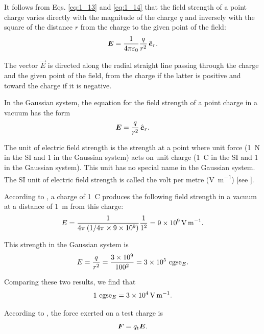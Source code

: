 It follows from Eqs. \eqref{eq:1_13} and \eqref{eq:1_14} that the field strength of a point charge varies directly with the magnitude of the charge $q$ and inversely with the square of the distance $r$ from the charge to the given point of the field:
\begin{equation}\label{eq:1_15}
	\boldsymbol{E} = \frac{1}{4\pi\varepsilon_0} \frac{q}{r^2}\, \hat{\boldsymbol{e}}_{r}.
\end{equation}

\noindent
The vector $\vec{E}$ is directed along the radial straight line passing through the charge and the given point of the field, from the charge if the latter is positive and toward the charge if it is negative.

In the Gaussian system, the equation for the field strength of a point charge in a vacuum has the form
\begin{equation}\label{eq:1_16}
	\boldsymbol{E} = \frac{q}{r^2}\, \hat{\boldsymbol{e}}_{r}.
\end{equation}

The unit of electric field strength is the strength at a point where unit force (\SI{1}{\newton} in the SI and \SI{1}{\dyne} in the Gaussian system) acts on unit charge (\SI{1}{\coulomb} in the SI and \num{1} in the Gaussian system). This unit has no special name in the Gaussian system. The SI unit of electric field strength is called the volt per metre (\si{\volt\per\metre}) [see ].

According to , a charge of \SI{1}{\coulomb} produces the following field strength in a vacuum at a distance of \SI{1}{\metre} from this charge:
\begin{equation*}
	E = \frac{1}{4\pi\left(1/4\pi \times \num{9e9}\right)} \frac{1}{1^2} = \SI{9e9}{\volt\per\metre}.
\end{equation*}

This strength in the Gaussian system is
\begin{equation*}
	E = \frac{q}{r^2} = \frac{\num{3e9}}{100^2} = \num{3e5}\text{~cgse$_{E}$}.
\end{equation*}

\noindent
Comparing these two results, we find that
\begin{equation}\label{eq:1_17}
	1\text{~cgse$_{E}$} = \SI{3e4}{\volt\per\metre}.
\end{equation}

According to , the force exerted on a test charge is
\begin{equation*}
	\boldsymbol{F} = q_{\text{t}} \boldsymbol{E}.
\end{equation*}

